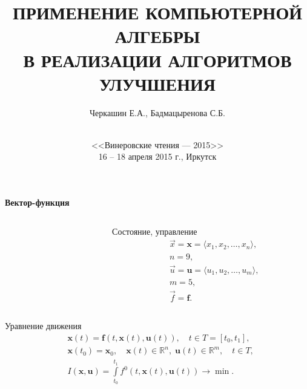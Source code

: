 \documentclass[10pt]{beamer}
\begin{document}
\title[КОМПЬЮТЕРНАЯ АЛГЕБРА В ЗАДАЧАХ ОПТИМИЗАЦИИ]{ПРИМЕНЕНИЕ КОМПЬЮТЕРНОЙ АЛГЕБРЫ\\
В РЕАЛИЗАЦИИ АЛГОРИТМОВ УЛУЧШЕНИЯ}
\author{Черкашин Е.А., Бадмацыренова С.Б.}
\date[2015]{{}\\[1.5cm]
<<Винеровские чтения --- 2015>>\\
16 -- 18 апреля 2015 г.,
Иркутск
}
\maketitle

\begin{frame}{\textbf{Вектор-функция} }
  \begin{columns}[t]
    \begin{column}{0.65\textwidth}
      \def\xyz{$x_1,x_2,x_3$} \def\yaw{$x_6$} \def\pitch{$x_5$}
      \def\roll{$x_4$} \def\lift{$x_9$} \def\down{$\quad\! x_7$}
      \def\thrust{$u_1$} \def\rudder{$u_5$} \def\drag{$x_8$}
      \def\flaps{$u_2$} \def\aeleron{$u_3$} \def\engine{}
      \def\elevator{$u_4$} \def\svgwidth{\columnwidth}
      
    \end{column}
    \begin{column}{0.35\textwidth}
      \begin{block}{Состояние, управление}%
        \vspace{-1.5em}
        \begin{align*}
          &\vec{x}=\mathbf{x}=\langle x_1,x_2,\ldots,x_n\rangle,\\
          &n=9,\\
          &\vec{u}=\mathbf{u}=\langle u_1,u_2,\ldots,u_m\rangle,\\
          &m=5,\\
          &\vec{f}=\mathbf{f}.
        \end{align*}
      \end{block}
    \end{column}
  \end{columns}
\begin{block}{Уравнение движения}
  \begin{align*}
&\mathbf{x}(t)=\mathbf{f}(t,\mathbf{x}(t),\mathbf{u}(t)),\quad t \in T=[t_0,t_1], \\
&\mathbf{x}(t_0)=\mathbf{x}_0,\quad \mathbf{x}(t)\in \mathbb{R}^n,\; \mathbf{u}(t) \in \mathbb{R}^m,\quad t\in T, \\
&I(\mathbf{x},\mathbf{u})=\int\limits_{t_0}^{t_1}f^0(t,\mathbf{x}(t),\mathbf{u}(t)) \to \min.
  \end{align*}
\end{block}
\end{frame}
\end{document}
